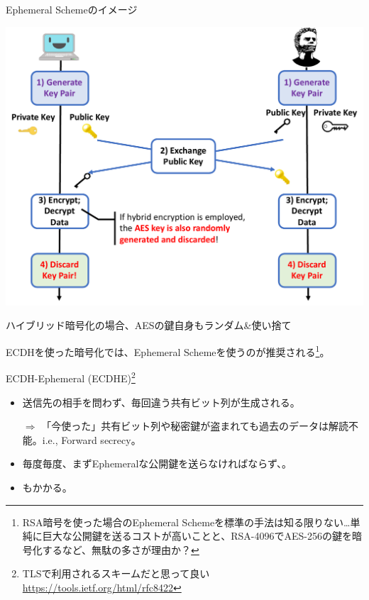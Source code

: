 \documentclass[12pt,dvipdfmx]{beamer}
\begin{document}
\begin{frame}
 Ephemeral Schemeのイメージ

\begin{center}
 \includegraphics[width=0.8\linewidth]{Figs/ephemeral-scheme-flow01.pdf}
\end{center}
ハイブリッド暗号化の場合、\alert{AESの鍵自身もランダム\&使い捨て}
\end{frame}

\begin{frame}
ECDHを使った暗号化では、Ephemeral Schemeを使うのが推奨される\footnote[frame]{\scriptsize  RSA暗号を使った場合のEphemeral Schemeを標準の手法は知る限りない…単純に巨大な公開鍵を送るコストが高いことと、RSA-4096でAES-256の鍵を暗号化するなど、無駄の多さが理由か？}。


\begin{block}{\small ECDH-Ephemeral (ECDHE)\footnote[frame]{\scriptsize TLSで利用されるスキームだと思って良い \url{https://tools.ietf.org/html/rfc8422}}}
\begin{itemize}
 \item 送信先の相手を問わず、毎回違う共有ビット列が生成される。

$\Rightarrow$ 「今使った」共有ビット列や秘密鍵が盗まれても過去のデータは解読不能。i.e., \alert{Forward secrecy}。
 \item 毎度毎度、まずEphemeralな公開鍵を送らなければならず、。
 \item {}もかかる。
\end{itemize}
\end{block}

\end{frame}
\end{document}
